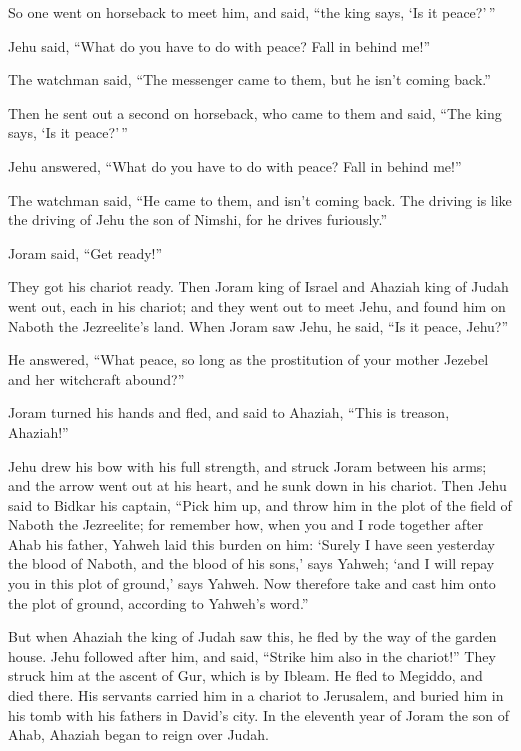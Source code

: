  So one went on horseback to meet him, and said, ``the
king says, `Is it peace?'\,''

Jehu said, ``What do you have to do with peace? Fall in behind me!''

The watchman said, ``The messenger came to them, but he isn't coming
back.''

 Then he sent out a second on horseback, who came to them
and said, ``The king says, `Is it peace?'\,''

Jehu answered, ``What do you have to do with peace? Fall in behind me!''

 The watchman said, ``He came to them, and isn't coming
back. The driving is like the driving of Jehu the son of Nimshi, for he
drives furiously.''

 Joram said, ``Get ready!''

They got his chariot ready. Then Joram king of Israel and Ahaziah king
of Judah went out, each in his chariot; and they went out to meet Jehu,
and found him on Naboth the Jezreelite's land.  When
Joram saw Jehu, he said, ``Is it peace, Jehu?''

He answered, ``What peace, so long as the prostitution of your mother
Jezebel and her witchcraft abound?''

 Joram turned his hands and fled, and said to Ahaziah,
``This is treason, Ahaziah!''

 Jehu drew his bow with his full strength, and struck
Joram between his arms; and the arrow went out at his heart, and he sunk
down in his chariot.  Then Jehu said to Bidkar his
captain, ``Pick him up, and throw him in the plot of the field of Naboth
the Jezreelite; for remember how, when you and I rode together after
Ahab his father, Yahweh laid this burden on him:  `Surely
I have seen yesterday the blood of Naboth, and the blood of his sons,'
says Yahweh; `and I will repay you in this plot of ground,' says Yahweh.
Now therefore take and cast him onto the plot of ground, according to
Yahweh's word.''

 But when Ahaziah the king of Judah saw this, he fled by
the way of the garden house. Jehu followed after him, and said, ``Strike
him also in the chariot!'' They struck him at the ascent of Gur, which
is by Ibleam. He fled to Megiddo, and died there.  His
servants carried him in a chariot to Jerusalem, and buried him in his
tomb with his fathers in David's city.  In the eleventh
year of Joram the son of Ahab, Ahaziah began to reign over Judah.


